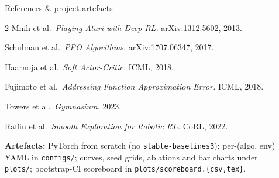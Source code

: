 \documentclass[final]{beamer}
\newlength{\sepwidth}
\newlength{\colwidth}
\newcommand{\separatorcolumn}{\begin{column}{\sepwidth}\end{column}}
\begin{document}
\begin{frame}[t]
\begin{columns}[t]
\begin{column}{\colwidth}
    \begin{block}{References \& project artefacts}
        \small
        \begin{multicols}{2}
        \setlength{\parskip}{0.15em}
        \noindent
        [1] Mnih et al.\ \textit{Playing Atari with Deep RL.} arXiv:1312.5602, 2013.

        \noindent
        [2] Schulman et al.\ \textit{PPO Algorithms.} arXiv:1707.06347, 2017.

        \noindent
        [3] Haarnoja et al.\ \textit{Soft Actor-Critic.} ICML, 2018.

        \noindent
        [4] Fujimoto et al.\ \textit{Addressing Function Approximation Error.} ICML, 2018.

        \noindent
        [5] Towers et al.\ \textit{Gymnasium.} 2023.

        \noindent
        [6] Raffin et al.\ \textit{Smooth Exploration for Robotic RL.} CoRL, 2022.
        \end{multicols}
        \vspace{0em}
        \textbf{Artefacts:} PyTorch from scratch (no \texttt{stable-baselines3});
        per-(algo, env) YAML in \texttt{configs/};
        curves, seed grids, ablations and bar charts under \texttt{plots/};
        bootstrap-CI scoreboard in \texttt{plots/scoreboard.\{csv,tex\}}.
    \end{block}

    \vfill

\end{column}
\separatorcolumn

\end{columns}
\end{frame}
\end{document}
